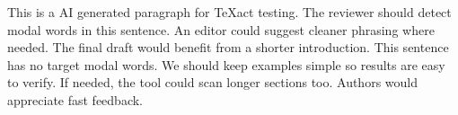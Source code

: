 \documentclass{article}
\begin{document}
This is a AI generated paragraph for TeXact testing.
The reviewer should detect modal words in this sentence.
An editor could suggest cleaner phrasing where needed.
The final draft would benefit from a shorter introduction.
This sentence has no target modal words.
We should keep examples simple so results are easy to verify.
If needed, the tool could scan longer sections too.
Authors would appreciate fast feedback.
\end{document}
